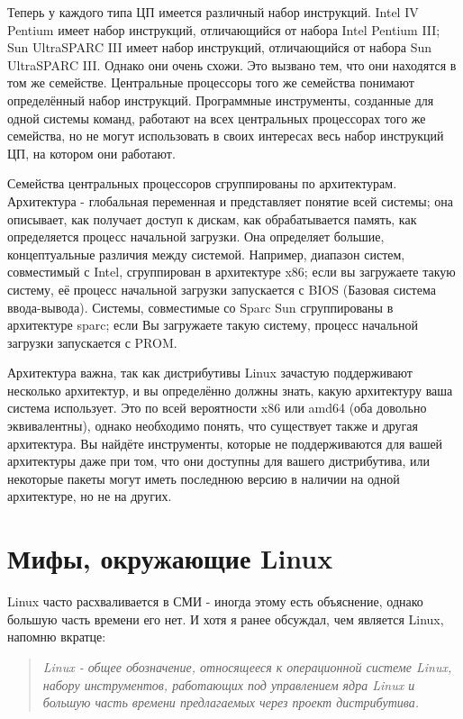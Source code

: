 \documentclass[10pt]{book}
\begin{document}
Теперь у каждого типа ЦП имеется различный набор инструкций. Intel IV Pentium имеет набор инструкций, отличающийся от набора Intel Pentium III; Sun UltraSPARC III  имеет набор инструкций, отличающийся от набора Sun UltraSPARC III. Однако они очень схожи. Это вызвано тем, что они находятся в том же семействе. Центральные процессоры того же семейства понимают определённый набор инструкций. Программные инструменты, созданные для одной системы команд, работают на всех центральных процессорах того же семейства, но не могут использовать в своих интересах весь набор инструкций ЦП, на котором они работают.

Семейства центральных процессоров сгруппированы по архитектурам. Архитектура - глобальная переменная и представляет понятие всей системы; она описывает, как получает доступ к дискам, как обрабатывается память, как определяется процесс начальной загрузки. Она определяет большие, концептуальные различия между системой. Например, диапазон систем, совместимый с Intel, сгруппирован в архитектуре x86; если вы загружаете такую систему, её процесс начальной загрузки запускается с BIOS (Базовая система ввода-вывода). Системы, совместимые со Sparc Sun сгруппированы в архитектуре sparc; если Вы загружаете такую систему, процесс начальной загрузки запускается с PROM.

Архитектура важна, так как дистрибутивы Linux зачастую поддерживают нес\-колько архитектур, и вы определённо должны знать, какую архитектуру  ваша система использует. Это по всей вероятности x86 или amd64 (оба довольно эквивалентны), однако необходимо понять, что существует также и другая архитектура. Вы найдёте инструменты, которые не поддерживаются для вашей архитектуры даже при том, что они доступны для вашего дистрибутива, или некоторые пакеты могут иметь последнюю версию в наличии на одной архитектуре, но не на других.

\section{Мифы, окружающие Linux}

Linux часто расхваливается в СМИ - иногда этому есть объяснение, однако большую часть времени его нет. И хотя я ранее обсуждал, чем является Linux, напомню вкратце:

\begin{quote}
\emph{Linux - общее обозначение, относящееся к операционной системе Linux, набору инструментов, работающих под управлением ядра Linux и большую часть времени предлагаемых через проект дистрибутива.}
\end{quote}
\end{document}

